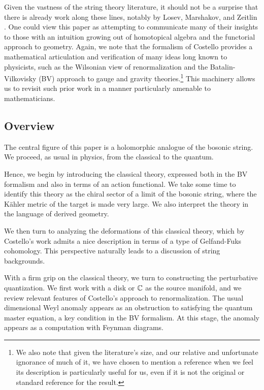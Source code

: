Given the vastness of the string theory literature,
it should not be a surprise that there is already work along these lines,
notably by Losev, Marshakov, and Zeitlin \cite{LMZ}.
One could view this paper as attempting to communicate many of their insights to those with an intuition growing out of homotopical algebra and the functorial approach to geometry.
Again, we note that the formalism of Costello provides a mathematical articulation and verification of many ideas long known to physicists, such as the Wilsonian view of renormalization and the Batalin-Vilkovisky (BV) approach to gauge and gravity theories.\footnote{We also note that given the literature's size,
and our relative and unfortunate ignorance of much of it,
we have chosen to mention a reference when we feel its description is particularly useful for us, 
even if it is not the original or standard reference for the result.}
This machinery allows us to revisit such prior work in a manner particularly amenable to mathematicians.

\subsection{Overview} \label{sec:bvoverview}

The central figure of this paper is a holomorphic analogue of the bosonic string.
We proceed, as usual in physics, from the classical to the quantum.

Hence, we begin by introducing the classical theory, 
expressed both in the BV formalism and also in terms of an action functional.
We take some time to identify this theory as the chiral sector of a limit of the bosonic string,
where the K\"{a}hler metric of the target is made very large. 
We also interpret the theory in the language of derived geometry.

We then turn to analyzing the deformations of this classical theory,
which by Costello's work admits a nice description in terms of a type of Gelfand-Fuks cohomology.
This perspective naturally leads to a discussion of string backgrounds.

With a firm grip on the classical theory, we turn to constructing the perturbative quantization.
We first work with a disk or $\mathbb C$ as the source manifold,
and we review relevant features of Costello's approach to renormalization.
The usual dimensional Weyl anomaly appears as an obstruction to satisfying the quantum master equation,
a key condition in the BV formalism.
At this stage, the anomaly appears as a computation with Feynman diagrams.


